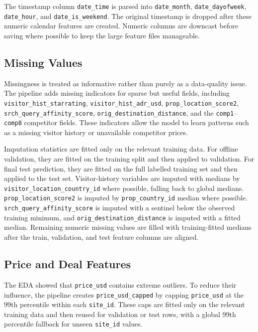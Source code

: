 The timestamp column \texttt{date\_time} is parsed into \texttt{date\_month}, \texttt{date\_dayofweek}, \texttt{date\_hour}, and \texttt{date\_is\_weekend}. The original timestamp is dropped after these numeric calendar features are created. Numeric columns are downcast before saving where possible to keep the large feature files manageable.

\subsection{Missing Values}

Missingness is treated as informative rather than purely as a data-quality issue. The pipeline adds missing indicators for sparse but useful fields, including \texttt{visitor\_hist\_starrating}, \texttt{visitor\_hist\_adr\_usd}, \texttt{prop\_location\_score2}, \texttt{srch\_query\_affinity\_score}, \texttt{orig\_destination\_distance}, and the \texttt{comp1}--\texttt{comp8} competitor fields. These indicators allow the model to learn patterns such as a missing visitor history or unavailable competitor prices.

Imputation statistics are fitted only on the relevant training data. For offline validation, they are fitted on the training split and then applied to validation. For final test prediction, they are fitted on the full labelled training set and then applied to the test set. Visitor-history variables are imputed with medians by \texttt{visitor\_location\_country\_id} where possible, falling back to global medians. \texttt{prop\_location\_score2} is imputed by \texttt{prop\_country\_id} median where possible. \texttt{srch\_query\_affinity\_score} is imputed with a sentinel below the observed training minimum, and \texttt{orig\_destination\_distance} is imputed with a fitted median. Remaining numeric missing values are filled with training-fitted medians after the train, validation, and test feature columns are aligned.

\subsection{Price and Deal Features}

The EDA showed that \texttt{price\_usd} contains extreme outliers. To reduce their influence, the pipeline creates \texttt{price\_usd\_capped} by capping \texttt{price\_usd} at the 99th percentile within each \texttt{site\_id}. These caps are fitted only on the relevant training data and then reused for validation or test rows, with a global 99th percentile fallback for unseen \texttt{site\_id} values.

